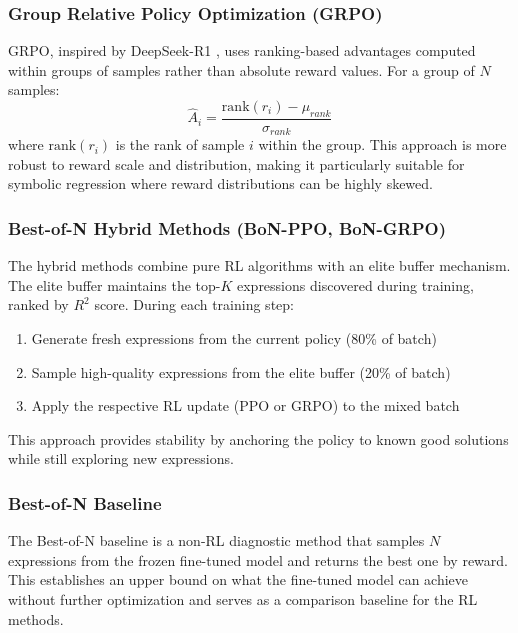 \subsubsection{Group Relative Policy Optimization (GRPO)}

GRPO, inspired by DeepSeek-R1 \cite{deepseek_r1_2025}, uses ranking-based advantages computed within groups of samples rather than absolute reward values. For a group of $N$ samples:
\begin{equation}
    \hat{A}_i = \frac{\text{rank}(r_i) - \mu_{rank}}{\sigma_{rank}}
\end{equation}
where $\text{rank}(r_i)$ is the rank of sample $i$ within the group. This approach is more robust to reward scale and distribution, making it particularly suitable for symbolic regression where reward distributions can be highly skewed.

\subsubsection{Best-of-N Hybrid Methods (BoN-PPO, BoN-GRPO)}

The hybrid methods combine pure RL algorithms with an elite buffer mechanism. The elite buffer maintains the top-$K$ expressions discovered during training, ranked by $R^2$ score. During each training step:
\begin{enumerate}
    \item Generate fresh expressions from the current policy (80\% of batch)
    \item Sample high-quality expressions from the elite buffer (20\% of batch)
    \item Apply the respective RL update (PPO or GRPO) to the mixed batch
\end{enumerate}

This approach provides stability by anchoring the policy to known good solutions while still exploring new expressions.

\subsubsection{Best-of-N Baseline}

The Best-of-N baseline is a non-RL diagnostic method that samples $N$ expressions from the frozen fine-tuned model and returns the best one by reward. This establishes an upper bound on what the fine-tuned model can achieve without further optimization and serves as a comparison baseline for the RL methods.

